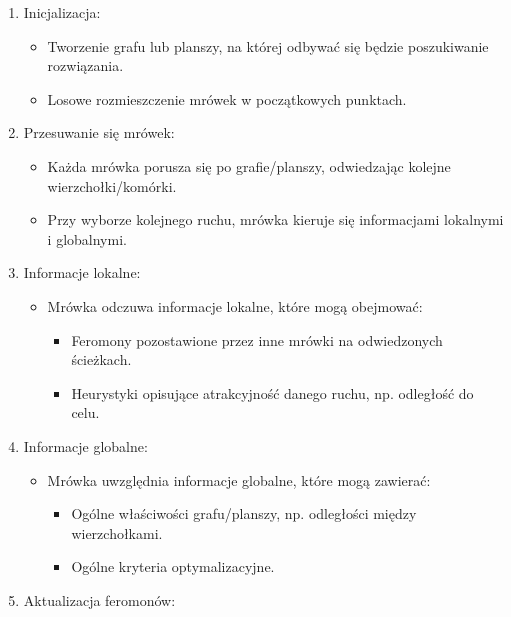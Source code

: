 \documentclass[11pt]{article}
\providecommand{\tightlist}{%
      \setlength{\itemsep}{0pt}\setlength{\parskip}{0pt}}
\begin{document}
\begin{enumerate}
\def\labelenumi{\arabic{enumi}.}
\tightlist
\item
  Inicjalizacja:

  \begin{itemize}
  \tightlist
  \item
    Tworzenie grafu lub planszy, na której odbywać się będzie
    poszukiwanie rozwiązania.
  \item
    Losowe rozmieszczenie mrówek w początkowych punktach.
  \end{itemize}
\item
  Przesuwanie się mrówek:

  \begin{itemize}
  \tightlist
  \item
    Każda mrówka porusza się po grafie/planszy, odwiedzając kolejne
    wierzchołki/komórki.
  \item
    Przy wyborze kolejnego ruchu, mrówka kieruje się informacjami
    lokalnymi i globalnymi.
  \end{itemize}
\item
  Informacje lokalne:

  \begin{itemize}
  \tightlist
  \item
    Mrówka odczuwa informacje lokalne, które mogą obejmować:

    \begin{itemize}
    \tightlist
    \item
      Feromony pozostawione przez inne mrówki na odwiedzonych ścieżkach.
    \item
      Heurystyki opisujące atrakcyjność danego ruchu, np. odległość do
      celu.
    \end{itemize}
  \end{itemize}
\item
  Informacje globalne:

  \begin{itemize}
  \tightlist
  \item
    Mrówka uwzględnia informacje globalne, które mogą zawierać:

    \begin{itemize}
    \tightlist
    \item
      Ogólne właściwości grafu/planszy, np. odległości między
      wierzchołkami.
    \item
      Ogólne kryteria optymalizacyjne.
    \end{itemize}
  \end{itemize}
\item
  Aktualizacja feromonów:


\end{enumerate}
\end{document}
